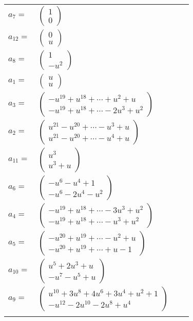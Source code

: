 \documentclass[1p]{elsarticle_modified}
\theoremstyle{definition}
\begin{document}
\begin{tabular}{m{7pt} m{180pt} m{7pt} m{180pt} }
\flushright $a_{7}=$&$\begin{pmatrix}1\\0\end{pmatrix}$ \\
\flushright $a_{12}=$&$\begin{pmatrix}0\\u\end{pmatrix}$ \\
\flushright $a_{8}=$&$\begin{pmatrix}1\\- u^2\end{pmatrix}$ \\
\flushright $a_{1}=$&$\begin{pmatrix}u\\u\end{pmatrix}$ \\
\flushright $a_{3}=$&$\begin{pmatrix}- u^{19}+u^{18}+\cdots+u^2+u\\- u^{19}+u^{18}+\cdots-2 u^3+u^2\end{pmatrix}$ \\
\flushright $a_{2}=$&$\begin{pmatrix}u^{21}- u^{20}+\cdots- u^3+u\\u^{21}- u^{20}+\cdots- u^4+u\end{pmatrix}$ \\
\flushright $a_{11}=$&$\begin{pmatrix}u^3\\u^3+u\end{pmatrix}$ \\
\flushright $a_{6}=$&$\begin{pmatrix}- u^6- u^4+1\\- u^6-2 u^4- u^2\end{pmatrix}$ \\
\flushright $a_{4}=$&$\begin{pmatrix}- u^{19}+u^{18}+\cdots-3 u^3+u^2\\- u^{19}+u^{18}+\cdots- u^3+u^2\end{pmatrix}$ \\
\flushright $a_{5}=$&$\begin{pmatrix}- u^{20}+u^{19}+\cdots- u^2+u\\- u^{20}+u^{19}+\cdots+u-1\end{pmatrix}$ \\
\flushright $a_{10}=$&$\begin{pmatrix}u^5+2 u^3+u\\- u^7- u^5+u\end{pmatrix}$ \\
\flushright $a_{9}=$&$\begin{pmatrix}u^{10}+3 u^8+4 u^6+3 u^4+u^2+1\\- u^{12}-2 u^{10}-2 u^8+u^4\end{pmatrix}$\\&\end{tabular}
\end{document}
